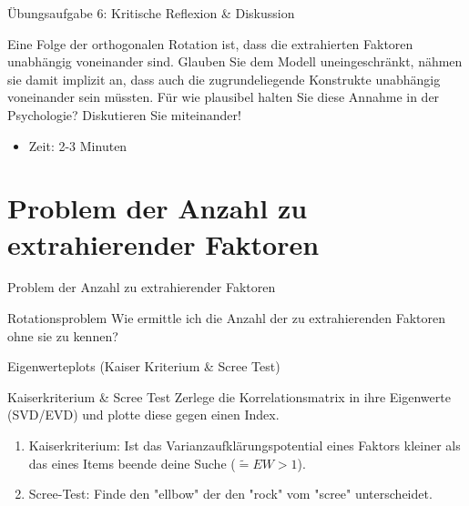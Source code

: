 \documentclass[
  ignorenonframetext,
]{beamer}
\providecommand{\tightlist}{%
  \setlength{\itemsep}{0pt}\setlength{\parskip}{0pt}}
\begin{document}
\begin{frame}{Übungsaufgabe 6: Kritische Reflexion \& Diskussion}
\protect\hypertarget{uxfcbungsaufgabe-6-kritische-reflexion-diskussion}{}
\begin{example}
Eine Folge der orthogonalen Rotation ist, dass die extrahierten Faktoren
unabhängig voneinander sind. Glauben Sie dem Modell uneingeschränkt, nähmen sie
damit implizit an, dass auch die zugrundeliegende Konstrukte unabhängig
voneinander sein müssten. Für wie plausibel halten Sie diese Annahme in der
Psychologie? Diskutieren Sie miteinander!
\end{example}

\begin{itemize}
\tightlist
\item
  Zeit: 2-3 Minuten
\end{itemize}
\end{frame}

\hypertarget{problem-der-anzahl-zu-extrahierender-faktoren}{%
\section{Problem der Anzahl zu extrahierender
Faktoren}\label{problem-der-anzahl-zu-extrahierender-faktoren}}

\begin{frame}{Problem der Anzahl zu extrahierender Faktoren}
\begin{alertblock}{Rotationsproblem}
  Wie ermittle ich die Anzahl der zu extrahierenden Faktoren ohne sie zu kennen?
\end{alertblock}

\end{frame}

\begin{frame}{Eigenwerteplots (Kaiser Kriterium \& Scree Test)}
\protect\hypertarget{eigenwerteplots-kaiser-kriterium-scree-test}{}
\begin{block}{Kaiserkriterium \& Scree Test}
Zerlege die Korrelationsmatrix in ihre Eigenwerte (SVD/EVD) und plotte diese
gegen einen Index.
\begin{enumerate}
  \item Kaiserkriterium: Ist das Varianzaufklärungspotential eines Faktors kleiner als das eines Items beende deine Suche ($\widetilde{=}EW > 1$). 
  \item Scree-Test: Finde den "ellbow" der den "rock" vom "scree" unterscheidet.
\end{enumerate}
\end{block}
\end{frame}
\end{document}

